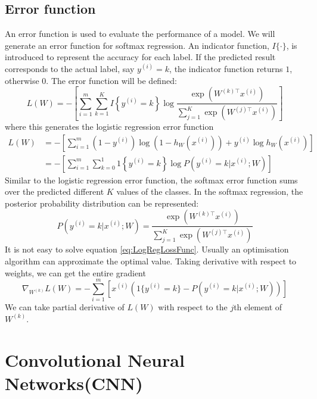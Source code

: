 \subsection{Error function}
An error function is used to evaluate the performance of a model. We will generate an error function for softmax regression. An indicator function, $I\{\cdot\}$, is introduced to represent the accuracy for each label. If the predicted result corresponds to the actual label, say $y^{(i)} = k$, the indicator function returns $1$, otherwise $0$. The error function will be defined:
\begin{equation}\label{eq:LogLossFunc}
L(W) = - \left[ \sum_{i=1}^{m} \sum_{k=1}^{K}  I\left\{y^{(i)} = k\right\} \log \frac{\exp(W^{(k)\top} x^{(i)})}{\sum_{j=1}^K \exp(W^{(j)\top} x^{(i)})}\right]
\end{equation}
where this generates the logistic regression error function
\begin{align}\label{eq:LogRegLossFunc}
L(W) &= - \left[ \sum_{i=1}^m   (1-y^{(i)}) \log (1-h_W(x^{(i)})) + y^{(i)} \log h_W(x^{(i)}) \right] \\
&= - \left[ \sum_{i=1}^{m} \sum_{k=0}^{1} 1\left\{y^{(i)} = k\right\} \log P(y^{(i)} = k | x^{(i)} ; W) \right]
\end{align}
Similar to the logistic regression error function, the softmax error function sums over the predicted different $K$ values of the classes. In the softmax regression, the posterior probability distribution can be represented:
\begin{equation}\label{eq:PostProbDis}
P(y^{(i)} = k | x^{(i)} ; W) = \frac{\exp(W^{(k)\top} x^{(i)})}{\sum_{j=1}^K \exp(W^{(j)\top} x^{(i)}) }
\end{equation}
It is not easy to solve equation \ref{eq:LogRegLossFunc}. Usually an optimisation algorithm can approximate the optimal value. Taking derivative with respect to weights, we can get the entire gradient 
\begin{equation}\label{eq:PartDer}
\nabla_{W^{(k)}} L(W) = - \sum_{i=1}^{m}{ \left[ x^{(i)} \left( 1\{ y^{(i)} = k\}  - P(y^{(i)} = k | x^{(i)}; W) \right) \right]  }
\end{equation}
We can take partial derivative of $L(W)$ with respect to the $j$th element of $W^{(k)}$.

\section{Convolutional Neural Networks(CNN)}

